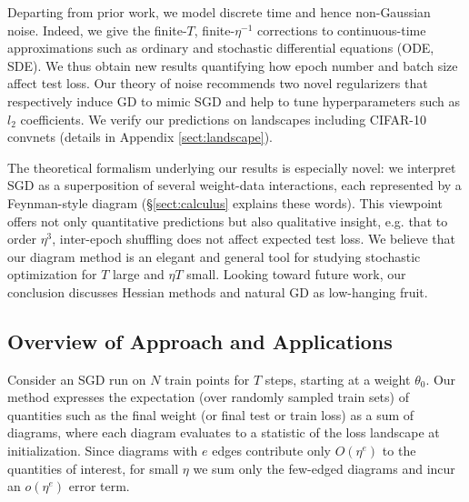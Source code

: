 \documentclass{article}
\theoremstyle{plain}
\theoremstyle{definition}
\begin{document}

    Departing from prior work, we model discrete time and hence non-Gaussian
    noise.  Indeed, we give the finite-$T$, finite-$\eta^{-1}$ corrections to
    continuous-time approximations such as ordinary and stochastic differential
    equations (ODE, SDE).  
    We thus obtain new results quantifying how epoch number and batch size
    affect test loss.
    Our theory of noise recommends two novel regularizers that respectively
    induce GD to mimic SGD and help to tune hyperparameters such as $l_2$
    coefficients.
    We verify our predictions on landscapes including CIFAR-10 convnets
    (details in Appendix \ref{sect:landscape}).



    The theoretical formalism underlying our results is especially novel: we
    interpret SGD as a superposition of several weight-data interactions, each
    represented by a Feynman-style diagram (\S \ref{sect:calculus}
    explains these words).  This viewpoint offers not only quantitative
    predictions but also qualitative insight, e.g. that to order $\eta^3$,
    inter-epoch shuffling does not affect expected test loss.
    We believe that our diagram method is an elegant and general tool for
    studying stochastic optimization for $T$ large and $\eta T$ small.  Looking
    toward future work, our conclusion discusses Hessian methods and natural GD
    as low-hanging fruit.

    \subsection{Overview of Approach and Applications}
    
        Consider an SGD run on $N$ train points for $T$ steps, starting at
        a weight $\theta_0$.  Our method expresses the expectation (over
        randomly sampled train sets) of quantities such as the final weight (or
        final test or train loss) as a sum of diagrams, where each diagram
        evaluates to a statistic of the loss landscape at initialization.
        Since diagrams with $e$ edges contribute only $O(\eta^e)$ to the
        quantities of interest, for small $\eta$ we sum only the few-edged
        diagrams and incur an $o(\eta^e)$ error term.
\end{document}
